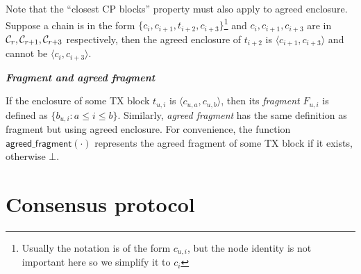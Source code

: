 Note that the ``closest CP blocks'' property must also apply to agreed enclosure. 
Suppose a chain is in the form
$\{c_{i}, c_{i+1}, t_{i+2}, c_{i+3}\}$\footnote{Usually the notation is of the form $c_{u, i}$, but the node identity is not important here so we simplify it to $c_{i}$}
and $c_{i}, c_{i+1}, c_{i+3}$ are in $\mathcal{C}_r, \mathcal{C}_{r+1}, \mathcal{C}_{r+3}$ respectively,
then the agreed enclosure of $t_{i+2}$ is $\langle c_{i+1}, c_{i+3}\rangle$ and cannot be $\langle c_{i}, c_{i+3}\rangle$.

\begin{definition}
\textbf{\emph{Fragment and agreed fragment}}

If the enclosure of some TX block $t_{u, i}$ is $\langle c_{u,a}, c_{u, b} \rangle$,
then its \emph{fragment} $F_{u, i}$ is defined as $\{ b_{u, i} : a \le i \le b \}$.
Similarly, \emph{agreed fragment} has the same definition as fragment but using agreed enclosure.
For convenience, the function $\textsf{agreed\_fragment}(\cdot)$ represents the agreed fragment of some TX block if it exists, otherwise $\bot$.
\end{definition}


\section{Consensus protocol}
\label{sec:cons-protocol}

